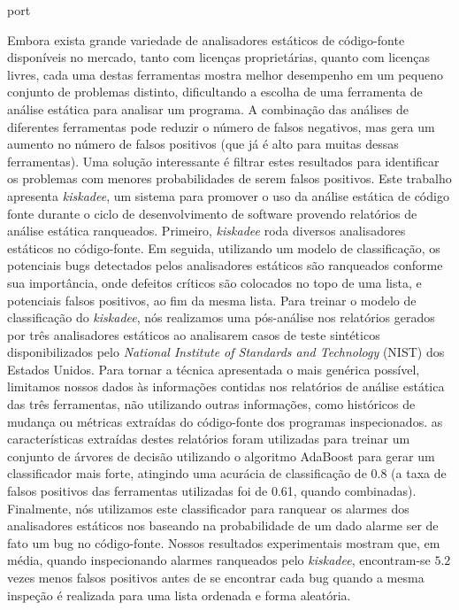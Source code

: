 \begin{resumo}{port}

Embora exista grande variedade de analisadores estáticos de código-fonte
disponíveis no mercado, tanto com licenças proprietárias, quanto com licenças
livres, cada uma destas ferramentas mostra melhor desempenho em um pequeno
conjunto de problemas distinto, dificultando a escolha de uma ferramenta de
análise estática para analisar um programa. A combinação das análises de
diferentes ferramentas pode reduzir o número de falsos negativos, mas gera um
aumento no número de falsos positivos (que já é alto para muitas dessas
ferramentas). Uma solução interessante é filtrar estes resultados para
identificar os problemas com menores probabilidades de serem falsos
positivos.
Este trabalho apresenta \textit{kiskadee}, um sistema para promover o uso da
análise estática de código fonte durante o ciclo de desenvolvimento de
software provendo relatórios de análise estática ranqueados. Primeiro,
\textit{kiskadee} roda diversos analisadores estáticos no código-fonte. Em seguida,
utilizando um modelo de classificação, os potenciais bugs detectados pelos
analisadores estáticos são ranqueados conforme sua importância, onde defeitos
críticos são colocados no topo de uma lista, e potenciais falsos positivos,
ao fim da mesma lista.
Para treinar o modelo de classificação do \textit{kiskadee}, nós realizamos uma
pós-análise nos relatórios gerados por três analisadores estáticos ao
analisarem casos de teste sintéticos disponibilizados pelo \textit{National
Institute of Standards and Technology} (NIST) dos Estados Unidos. Para tornar
a técnica apresentada o mais genérica possível, limitamos nossos dados às
informações contidas nos relatórios de análise estática das três ferramentas,
não utilizando outras informações, como históricos de mudança ou métricas
extraídas do código-fonte dos programas inspecionados. as características
extraídas destes relatórios foram utilizadas para treinar um conjunto de
árvores de decisão utilizando o algoritmo AdaBoost para gerar um
classificador mais forte, atingindo uma acurácia de classificação de 0.8 (a
taxa de falsos positivos das ferramentas utilizadas foi de 0.61, quando
combinadas). Finalmente, nós utilizamos este classificador para ranquear os
alarmes dos analisadores estáticos nos baseando na probabilidade de um dado
alarme ser de fato um bug no código-fonte. Nossos resultados experimentais
mostram que, em média, quando inspecionando alarmes ranqueados pelo \textit{kiskadee},
encontram-se $5.2$ vezes menos falsos positivos antes de se encontrar cada bug
quando a mesma inspeção é realizada para uma lista ordenada e forma aleatória.

\end{resumo}

